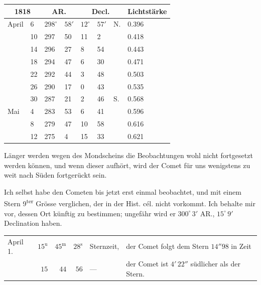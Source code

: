 \begin{center}\fontsize{10}{12}\selectfont\setlength{\tabcolsep}{3pt}
\begin{tabular}{ll|ll|lll|l}
\multicolumn{2}{c|}{1818} & \multicolumn{2}{c|}{AR.} & \multicolumn{3}{c|}{Decl.} & Lichtstärke \\
\hline
April & 6  & $298^\circ$ & $58'$ & $12^\circ$ & $57'$ & N. & 0.396 \\
      & 10 & 297 & 50 & 11 & 2  &    & 0.418 \\
      & 14 & 296 & 27 & 8  & 54 &    & 0.443 \\
      & 18 & 294 & 47 & 6  & 30 &    & 0.471 \\
      & 22 & 292 & 44 & 3  & 48 &    & 0.503 \\
      & 26 & 290 & 17 & 0  & 43 &    & 0.535 \\
      & 30 & 287 & 21 & 2  & 46 & S. & 0.568 \\
Mai   & 4  & 283 & 53 & 6  & 41 &    & 0.596 \\
      & 8  & 279 & 47 & 10 & 58 &    & 0.616 \\
      & 12 & 275 & 4  & 15 & 33 &    & 0.621 \\
\end{tabular}
\end{center}

\par\indent Länger werden wegen des Mondscheins die Beobachtungen wohl nicht fortgesetzt
werden können, und wenn dieser aufhört, wird der Comet für uns wenigstens zu
weit nach Süden fortgerückt sein.

\par\indent Ich selbst habe den Cometen bis jetzt erst einmal beobachtet, und mit einem
Stern 9\textsuperscript{ter} Grösse verglichen, der in der Hist. cél. nicht vorkommt. Ich
behalte mir vor, dessen Ort künftig zu bestimmen; ungefähr wird er
$300^\circ\,3'$ AR., $15^\circ\,9'$ Declination haben.

\begin{center}\fontsize{9}{11}\selectfont\setlength{\tabcolsep}{3pt}\begin{tabular}{lrrrll}
April 1. & $15^{\mathrm u}$ & $45^{\mathrm m}$ & $28^{\mathrm s}$ & Sternzeit, & \shortstack[l]{der Comet folgt dem Stern\\$14''98$ in Zeit}\\
& $15$ & $44$ & $56$ & — & \shortstack[l]{der Comet ist $4'\,22''$\\südlicher als der Stern.}\\
\end{tabular}\end{center}

